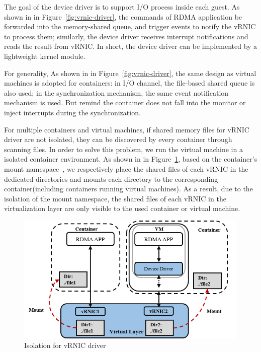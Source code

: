 The goal of the device driver is to support I/O process inside each guest. As shown in in Figure~\ref{fig:vrnic-driver},  the commands of RDMA application be forwarded into the memory-shared queue, and trigger events to notify the vRNIC to process them; similarly, the device driver receives interrupt notifications and reads the result from vRNIC. In short, the device driver can be implemented by a lightweight kernel module.
	
For generality, As shown in in Figure~\ref{fig:vrnic-driver}, the same design as virtual machines is adopted for containers: in I/O channel, the file-based shared queue is also used; in the synchronization mechanism, the same event notification mechanism is used. But remind the container does not fall into the monitor or inject interrupts during the synchronization.

For multiple containers and virtual machines, if shared memory files for vRNIC driver are not isolated, they can be discovered by every container through scanning files. In order to solve this problem, we run the virtual machine in a isolated container environment. As shown in in Figure~\ref{fig:interface-isolate}, based on the container's mount namespace~\cite{mount-ns}, we respectively place the shared files of each vRNIC in the dedicated directories and mounts each directory to the corresponding container(including containers running virtual machines). As a result, due to the isolation of the mount namespace, the shared files of each vRNIC in the virtualization layer are only visible to the used container or virtual machine.  

\begin{figure}[!ht]
	\centering
	\includegraphics[width=1.0\linewidth]{images/interface-isolate}
	\caption{Isolation for vRNIC driver}
	\label{fig:interface-isolate}
\end{figure}


